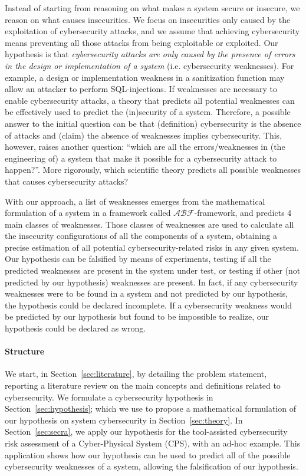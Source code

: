 \documentclass[conference]{IEEEtran}
\newcommand{\assertionRegion}{\mathcal{A}}
\newcommand{\beliefRegion}{\mathcal{B}}
\newcommand{\factRegion}{\mathcal{F}}
\newcommand{\abftheory}{\assertionRegion\beliefRegion\factRegion}
\begin{document}
Instead of starting from reasoning on what makes a system secure or insecure,
we reason on what causes insecurities. 
We focus on insecurities only caused by
the exploitation of cybersecurity attacks, and we assume that achieving
cybersecurity means preventing all those attacks from being exploitable or
exploited.  Our hypothesis is that \emph{cybersecurity attacks are only caused by the
presence of errors in the design or implementation of a system} (i.e.
cybersecurity weaknesses).  For example, a design or implementation weakness in
a sanitization function may allow an attacker to perform SQL-injections. If
weaknesses are necessary to enable cybersecurity attacks, a theory that
predicts all potential weaknesses can be effectively used to predict the
(in)security of a system.  Therefore, a possible answer to the initial question
can be that (definition) cybersecurity is the absence of attacks and (claim)
the absence of weaknesses implies cybersecurity.  This, however, raises another
question: ``which are all the errors/weaknesses in (the engineering of) a
system that make it possible for a cybersecurity attack to happen?''. More
rigorously, which scientific theory predicts all possible weaknesses that
causes cybersecurity attacks? 

With our approach, a list of weaknesses emerges from the mathematical
formulation of a system in a framework called $\abftheory$-framework, and
predicts 4 main classes of weaknesses. Those classes of weaknesses are used to
calculate all the insecurity configurations of all the components of a system,
obtaining a precise estimation of all potential cybersecurity-related risks in
any given system. Our hypothesis can be falsified by means of experiments,
testing if all the predicted weaknesses are present in the system under test,
or testing if other (not predicted by our hypothesis) weaknesses are present.
In fact, if any cybersecurity weaknesses were to be found in a system and not
predicted by our hypothesis, the hypothesis could be declared incomplete.  If a
cybersecurity weakness would be predicted by our hypothesis but found to be impossible
to realize, our hypothesis could be declared as wrong.


\paragraph{Structure} 
We start, in Section~\ref{sec:literature}, by detailing the problem statement,
reporting a literature review on the main concepts and definitions related to
cybersecurity.  We formulate a cybersecurity hypothesis in Section~\ref{sec:hypothesis};
which we use to propose a mathematical formulation of our hypothesis on system cybersecurity in
Section~\ref{sec:theory}. In Section~\ref{sec:secra}, we apply our hypothesis for
the tool-assisted cybersecurity risk assessment of a Cyber-Physical System (CPS), with an ad-hoc example.
This application shows
how our hypothesis can be used to predict all of the possible cybersecurity weaknesses
of a system, allowing the falsification of our hypothesis.  
\end{document}
